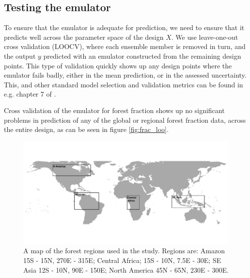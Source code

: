 \documentclass[esd, manuscript]{copernicus} %
\begin{document}
\subsection{Testing the emulator}
To ensure that the emulator is adequate for prediction, we need to ensure that it predicts well across the parameter space of the design $X$. We use leave-one-out cross validation (LOOCV), where each ensemble member is removed in turn, and the output $y$ predicted with an emulator constructed from the remaining design points. This type of validation quickly shows up any design points where the emulator fails badly, either in the mean prediction, or in the assessed uncertainty. This, and other standard model selection and validation metrics can be found in e.g. chapter 7 of \citep{hastie2009elements}.

Cross validation of the emulator for forest fraction shows up no significant problems in prediction of any of the global or regional forest fraction data, across the entire design, as can be seen in figure \ref{fig:frac_loo}.





\begin{figure}[t]
\includegraphics[width=12cm]{graphics/map_forests.pdf}
\caption{A map of the forest regions used in the study. Regions are: Amazon 15\textdegree S - 15\textdegree N, 270\textdegree E - 315\textdegree E; Central Africa; 15\textdegree S - 10\textdegree N, 7.5\textdegree E - 30\textdegree E; SE Asia 12\textdegree S - 10\textdegree N, 90\textdegree E - 150\textdegree E; North America 45\textdegree N - 65\textdegree N, 230\textdegree E - 300\textdegree E.}
\label{fig:map_forests}
\end{figure}
\end{document}
